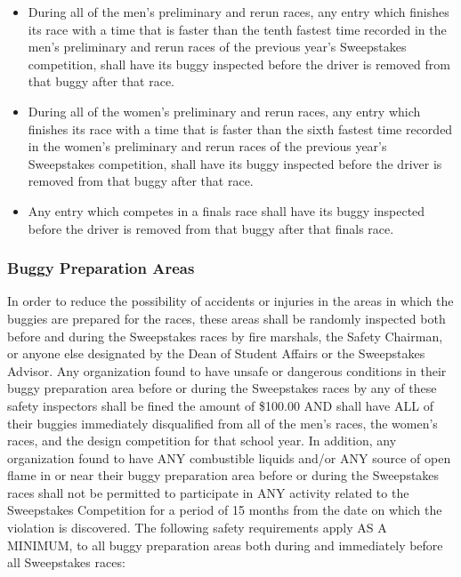 	\begin{itemize}

		\item
		During all of the men's preliminary and rerun races, any entry which finishes
		its race with a time that is faster than the tenth fastest time recorded in the
		men's preliminary and rerun races of the previous year's Sweepstakes
		competition, shall have its buggy inspected before the driver is removed from
		that buggy after that race.

		\item
		During all of the women's preliminary and rerun races, any entry which finishes
		its race with a time that is faster than the sixth fastest time recorded in the
		women's preliminary and rerun races of the previous year's Sweepstakes
		competition, shall have its buggy inspected before the driver is removed from
		that buggy after that race.

		\item
		Any entry which competes in a finals race shall have its buggy inspected before
		the driver is removed from that buggy after that finals race.

	\end{itemize}

\subsubsection{Buggy Preparation Areas}

	In order to reduce the possibility of accidents or injuries in the areas in
	which the buggies are prepared for the races, these areas shall be randomly
	inspected both before and during the Sweepstakes races by fire marshals, the
	Safety Chairman, or anyone else designated by the Dean of Student Affairs or
	the Sweepstakes Advisor. Any organization found to have unsafe or dangerous
	conditions in their buggy preparation area before or during the Sweepstakes
	races by any of these safety inspectors shall be fined the amount of \$100.00
	AND shall have ALL of their buggies immediately disqualified from all of the
	men's races, the women's races, and the design competition for that school
	year. In addition, any organization found to have ANY combustible liquids
	and/or ANY source of open flame in or near their buggy preparation area before
	or during the Sweepstakes races shall not be permitted to participate in ANY
	activity related to the Sweepstakes Competition for a period of 15 months from
	the date on which the violation is discovered. The following safety
	requirements apply AS A MINIMUM, to all buggy preparation areas both during and
	immediately before all Sweepstakes races:

